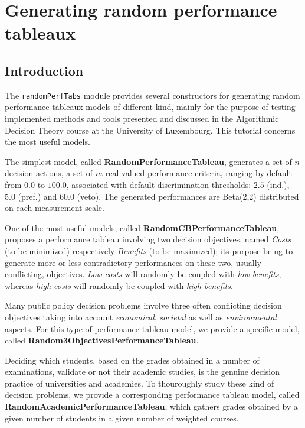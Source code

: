 \chapter{Generating random performance tableaux}
\label{sec:6}



\section{Introduction}
\label{sec:6.1}

The {\tt randomPerfTabs} module provides several constructors for generating random performance tableaux models of different kind, mainly for the purpose of testing implemented methods and tools presented and discussed in the Algorithmic Decision Theory course at the University of Luxembourg. This tutorial concerns the most useful models.

The simplest model, called \textbf{RandomPerformanceTableau}, generates a set of $n$ decision actions, a set of $m$ real-valued performance criteria, ranging by default from $0.0$ to $100.0$, associated with default discrimination thresholds: $2.5$ (ind.), $5.0$ (pref.) and $60.0$ (veto). The generated performances are Beta(2,2) distributed on each measurement scale.

One of the most useful models, called \textbf{RandomCBPerformanceTableau}, proposes a performance tableau involving two decision objectives, named \emph{Costs} (to be minimized) respectively \emph{Benefits} (to be maximized); its purpose being to generate more or less contradictory performances on these two, usually conflicting, objectives. \emph{Low costs} will randomly be coupled with \emph{low benefits}, whereas \emph{high costs} will randomly be coupled with \emph{high benefits}.

Many public policy decision problems involve three often conflicting decision objectives taking into account \emph{economical}, \emph{societal} as well as \emph{environmental} aspects. For this type of performance tableau model, we provide a specific model, called \textbf{Random3ObjectivesPerformanceTableau}.

Deciding which students, based on the grades obtained in a number of examinations, validate or not their academic studies, is the genuine decision practice of universities and academies. To thouroughly study these kind of decision problems, we provide a corresponding performance tableau model, called \textbf{RandomAcademicPerformanceTableau}, which gathers grades obtained by a given number of students in a given number of weighted courses.    


